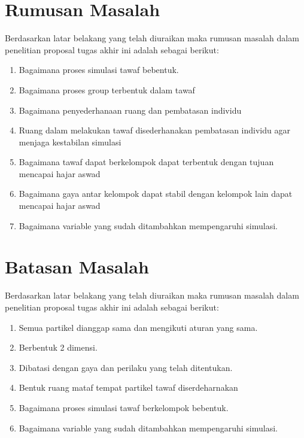 \section{Rumusan Masalah}\label{sec:rumusan}
Berdasarkan latar belakang yang telah diuraikan maka rumusan masalah dalam penelitian proposal tugas akhir ini adalah sebagai berikut: 

\begin{enumerate}
\item{Bagaimana proses simulasi tawaf bebentuk.}
\item{Bagaimana proses group terbentuk dalam tawaf}
\item{Bagaimana penyederhanaan ruang dan pembatasan individu}
\item{Ruang dalam melakukan tawaf disederhanakan pembatasan individu agar menjaga kestabilan simulasi}
\item{Bagaimana tawaf dapat berkelompok dapat terbentuk dengan tujuan mencapai hajar aswad}
\item{Bagaimana gaya antar kelompok dapat stabil dengan kelompok lain dapat mencapai hajar aswad}
\item{Bagaimana variable yang sudah ditambahkan mempengaruhi simulasi.}
\end{enumerate}

\section{Batasan Masalah}\label{sec:batasan}
Berdasarkan latar belakang yang telah diuraikan maka rumusan masalah dalam penelitian proposal tugas akhir ini adalah sebagai berikut:
\begin{enumerate} 
\item{Semua partikel dianggap sama dan mengikuti aturan yang sama.} 
\item{Berbentuk 2 dimensi.} 
\item{Dibatasi dengan gaya dan perilaku yang telah ditentukan.} 
\item{Bentuk ruang mataf tempat partikel tawaf diserdeharnakan}
\item{Bagaimana proses simulasi tawaf berkelompok  bebentuk.} 
\item{Bagaimana variable yang sudah ditambahkan mempengaruhi simulasi.}
\end{enumerate}


